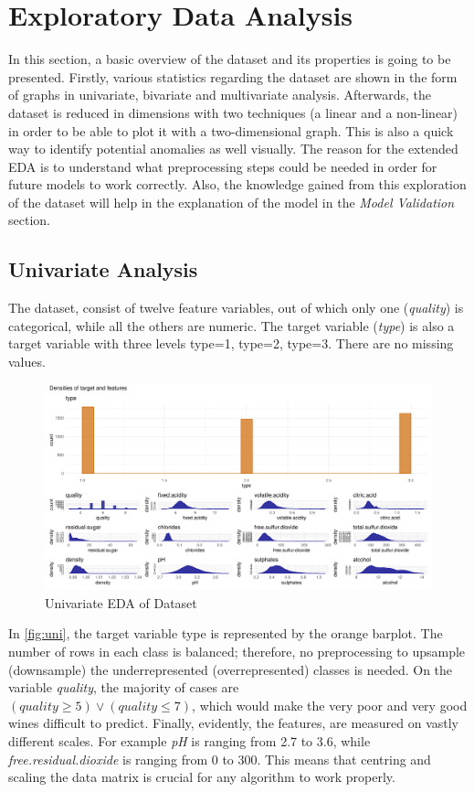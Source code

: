 \documentclass[11pt,twoside]{article}
\numberwithin{Theorem}{section}
\numberwithin{Definition}{section}
\numberwithin{Lemma}{section}
\numberwithin{Algorithm}{section}
\numberwithin{equation}{section}
\begin{document}
\section{Exploratory Data Analysis}
In this section, a basic overview of the dataset and its properties is going to be presented. Firstly, various statistics regarding the dataset are shown in the form of graphs in univariate, bivariate and multivariate analysis. Afterwards, the dataset is reduced in dimensions with two techniques (a linear and a non-linear) in order to be able to plot it with a two-dimensional graph. This is also a quick way to identify potential anomalies as well visually. The reason for the extended EDA is to understand what preprocessing steps could be needed in order for future models to work correctly. Also, the knowledge gained from this exploration of the dataset will help in the explanation of the model in the \textit{Model Validation} section.
\subsection{Univariate Analysis}
\label{sec:univariate}
The dataset, consist of twelve feature variables, out of which only one (\textit{quality}) is categorical, while all the others are numeric. The target variable (\textit{type}) is also a target variable with three levels \textsf{type=1, type=2, type=3}. There are no missing values.
\vspace*{1em}
\begin{figure}[!h]
\centering
\includegraphics[width=\textwidth]{./output/1.h.univariate-analysis.pdf}
\caption{Univariate EDA of Dataset}
\label{fig:uni}
\end{figure}
\vspace{2em}
In \autoref{fig:uni}, the target variable type is represented by the orange barplot. The number of rows in each class is balanced; therefore, no preprocessing to upsample (downsample) the underrepresented (overrepresented) classes is needed. On the variable \textit{quality}, the majority of cases are \\
 $(quality\geq5) \lor (quality\leq7)$, which would make the very poor and very good wines difficult to predict. Finally, evidently, the features, are measured on vastly different scales. For example \textit{pH} is ranging from 2.7 to 3.6, while \textit{free.residual.dioxide} is ranging from 0 to 300. This means that centring and scaling the data matrix is crucial for any algorithm to work properly.
\end{document}
